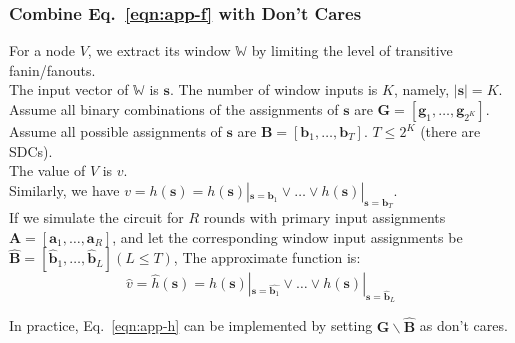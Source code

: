 \documentclass{rpt}
\begin{document}
\subsubsection{Combine Eq.~\eqref{eqn:app-f} with Don't Cares}
For a node $V$,
we extract its window $\mathbb{W}$ by limiting the level of transitive fanin/fanouts. \\
The input vector of $\mathbb{W}$ is $\mathbf{s}$.
The number of window inputs is $K$,
namely,
$|\mathbf{s}| = K$. \\
Assume all binary combinations of the assignments of $\mathbf{s}$ are $\mathbf{G} =  [\mathbf{g}_1, \ldots, \mathbf{g}_{2^K}] $. \\
Assume all possible assignments of $\mathbf{s}$ are $ \mathbf{B} = [\mathbf{b}_1, \ldots, \mathbf{b}_T] $.
$T \leq 2^K$ (there are SDCs). \\
The value of $V$ is $v$. \\
Similarly,
we have $v = h(\mathbf{s}) = h(\mathbf{s})|_{\mathbf{s} = \mathbf{b}_1} \lor \ldots \lor h(\mathbf{s})|_{\mathbf{s} = \mathbf{b}_T}
$. \\
If we simulate the circuit for $R$ rounds with primary input assignments $\mathbf{A} = [\mathbf{a}_1, \ldots, \mathbf{a}_R]$,
and let the corresponding window input assignments be $\hat{\mathbf{B}} = [\hat{\mathbf{b}}_1, \ldots, \hat{\mathbf{b}}_L](L \leq T)$,
The approximate function is:
\begin{equation}
    \label{eqn:app-h}
    \hat{v} = \hat{h}(\mathbf{s}) =
    h(\mathbf{s})|_{\mathbf{s} = \hat{\mathbf{b}_1}} \lor \ldots \lor h(\mathbf{s})|_{\mathbf{s} = \hat{\mathbf{b}}_L}
\end{equation}

In practice,
Eq.~\eqref{eqn:app-h} can be implemented by setting $\mathbf{G} \backslash \hat{\mathbf{B}} $ as don't cares.


% 
\end{document}
